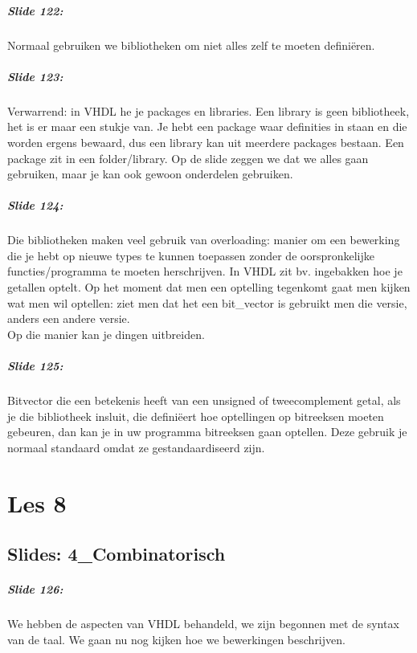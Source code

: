 \documentclass[10pt,a4paper]{book}
\begin{document}
\paragraph{Slide 122:} Normaal gebruiken we bibliotheken om niet alles zelf te moeten defini\"eren.

\paragraph{Slide 123:} Verwarrend: in VHDL he je packages en libraries. Een library is geen bibliotheek, het is er maar een stukje van. Je hebt een package waar definities in staan en die worden ergens bewaard, dus een library kan uit meerdere packages bestaan. Een package zit in een folder/library. Op de slide zeggen we dat we alles gaan gebruiken, maar je kan ook gewoon onderdelen gebruiken.

\paragraph{Slide 124:} Die bibliotheken maken veel gebruik van overloading: manier om een bewerking die je hebt op nieuwe types te kunnen toepassen zonder de oorspronkelijke functies/programma te moeten herschrijven. In VHDL zit bv. ingebakken hoe je getallen optelt. Op het moment dat men een optelling tegenkomt gaat men kijken wat men wil optellen: ziet men dat het een bit\_vector is gebruikt men die versie, anders een andere versie.\\
Op die manier kan je dingen uitbreiden.

\paragraph{Slide 125:} Bitvector die een betekenis heeft van een unsigned of tweecomplement getal, als je die bibliotheek insluit, die defini\"eert hoe optellingen op bitreeksen moeten gebeuren, dan kan je in uw programma bitreeksen gaan optellen. Deze gebruik je normaal standaard omdat ze gestandaardiseerd zijn.

\chapter{Les 8}

\section{Slides: 4\_Combinatorisch}

\paragraph{Slide 126:} We hebben de aspecten van VHDL behandeld, we zijn begonnen met de syntax van de taal. We gaan nu nog kijken hoe we bewerkingen beschrijven.
\end{document}
